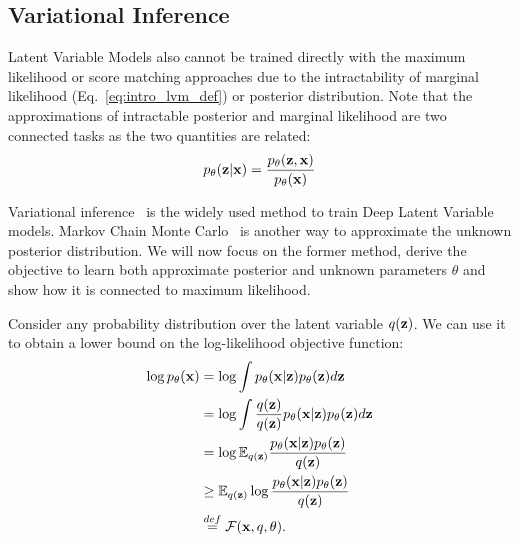 \subsection{Variational Inference}\label{sec:intro_vi}
Latent Variable Models also cannot be trained directly with the maximum likelihood or score matching approaches due to the intractability of marginal likelihood (Eq.~\ref{eq:intro_lvm_def}) or posterior distribution. 
Note that the approximations of intractable posterior and marginal likelihood are two connected tasks as the two quantities are related:
\begin{equation}
    p_{\theta}({\mathbf{z}}|{\mathbf{x}}) = \frac{p_{\theta}({\mathbf{z}}, {\mathbf{x}})}{p_{\theta}({\mathbf{x}})}
\end{equation}

Variational inference~\citep{jordan1999introduction} is the widely used method to train Deep Latent Variable models. 
Markov Chain Monte Carlo~\citep{neal1993probabilistic} is another way to approximate the unknown posterior distribution. 
We will now focus on the former method, derive the objective to learn both approximate posterior and unknown parameters $\theta$ and show how it is connected to maximum likelihood. 


Consider any probability distribution over the latent variable $q({\mathbf{z}})$. We can use it to obtain a lower bound on the log-likelihood objective function:
\begin{align}
    \log p_{\theta}(\rvx) &=  \log \int p_{\theta}(\rvx|\rvz)p_{\theta}(\rvz)d\rvz \label{eq:intro_elbo_def_1}\\
   &=  \log \int \frac{q(\rvz)}{q(\rvz)} p_{\theta}(\rvx|\rvz)p_{\theta}(\rvz)d\rvz \label{eq:intro_elbo_def_2}\\
   &=  \log \E_{q(\rvz)} \frac{p_{\theta}(\rvx|\rvz)p_{\theta}(\rvz)}{q(\rvz)} \label{eq:intro_elbo_def_3}\\
   &\geq  \E_{q(\rvz)}\log  \frac{p_{\theta}(\rvx|\rvz)p_{\theta}(\rvz)}{q(\rvz)} \label{eq:intro_elbo_def_4}\\
   &\overset{def}{=} \mathcal{F}(\rvx, q, \theta). \notag
\end{align}

